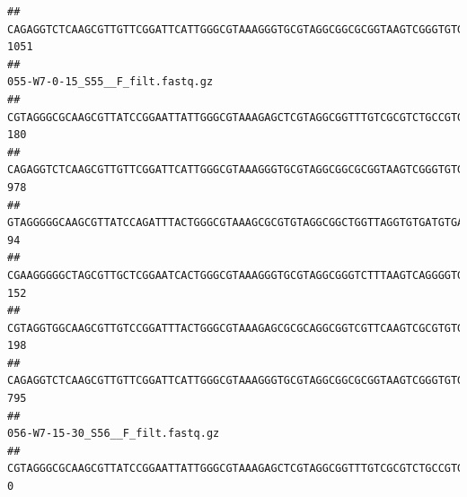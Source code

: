 \documentclass[]{article}
\begin{document}
\begin{verbatim}
## CAGAGGTCTCAAGCGTTGTTCGGATTCATTGGGCGTAAAGGGTGCGTAGGCGGCGCGGTAAGTCGGGTGTGAAATCTCGGGGCTTAACTCCGAAACTGCATTCGATACTGCCGTGCTTGAGGACTGGAGAGGAGACTGGAATTTACGGTGTAGCGGTGAAATGCGTAGATATCGTAAGGAAGACCAGTGGCGAAGGCGGGTCTCTGGACAGTTCCTGACGCTGAGGCACGAAGGCCAGGGGAGCAAACG                              1051
##                                                                                                                                                                                                                                                           055-W7-0-15_S55__F_filt.fastq.gz
## CGTAGGGCGCAAGCGTTATCCGGAATTATTGGGCGTAAAGAGCTCGTAGGCGGTTTGTCGCGTCTGCCGTGAAAGTCCGGGGCTCAACTCCGGATCTGCGGTGGGTACGGGCAGACTAGAGTGATGTAGGGGAGACTGGAATTCCTGGTGTAGCGGTGAAATGCGCAGATATCAGGAGGAACACCGATGGCGAAGGCAGGTCTCTGGGCATTAACTGACGCTGAGGAGCGAAAGCATGGGGAGCGAACA                              180
## CAGAGGTCTCAAGCGTTGTTCGGATTCATTGGGCGTAAAGGGTGCGTAGGCGGCGCGGTAAGTCGGGTGTGAAATCTCGGAGCTTAACTCCGAAACTGCATTCGATACTGCCGTGCTTGAGGACTGGAGAGGAGACTGGAATTTACGGTGTAGCGGTGAAATGCGTAGATATCGTAAGGAAGACCAGTGGCGAAGGCGGGTCTCTGGACAGTTCCTGACGCTGAGGCACGAAGGCCAGGGGAGCAAACG                              978
## GTAGGGGGCAAGCGTTATCCAGATTTACTGGGCGTAAAGCGCGTGTAGGCGGCTGGTTAGGTGTGATGTGAAATCTTCCGGCTCAACCGGAAAACTGCATTGCAAACCGGCCTGGCTAGAGTGCAGGAGAGGGAAGCGGAATTCCAGGTGTAGCGGTGAAATGCGTAGATATCTGGAGGAACACCAGTGGCGAAGGCGGCTTCCTGGCCTGCAACTGACGCTGAGACGCGAAAGCGTGGGGAGCGAAC                                94
## CGAAGGGGGCTAGCGTTGCTCGGAATCACTGGGCGTAAAGGGTGCGTAGGCGGGTCTTTAAGTCAGGGGTGAAATCCTGGAGCTCAACTCCAGAACTGCCTTTGATACTGAAGATCTTGAGTTCGGGAGAGGTGAGTGGAACTGCGAGTGTAGAGGTGAAATTCGTAGATATTCGCAAGAACACCAGTGGCGAAGGCGGCTCACTGGCCCGATACTGACGCTGAGGCACGAAAGCGTGGGGAGCAAACA                              152
## CGTAGGTGGCAAGCGTTGTCCGGATTTACTGGGCGTAAAGAGCGCGCAGGCGGTCGTTCAAGTCGCGTGTGAAAGCCCCCGGCTCAACTGGGGAGGGTCACGCGATACTGATCGACTCGAAGGCAGGAGAGGGTAGTGGAATTCCCGGTGTAGTGGTGAAATGCGTAGATATCGGGAGGAACACCAGTGGCGAAGGCGACTACCTGGCCTGTTCTTGACGCTGAGGCGCGAAAGCTAGGGGAGCAAACG                              198
## CAGAGGTCTCAAGCGTTGTTCGGATTCATTGGGCGTAAAGGGTGCGTAGGCGGCGCGGTAAGTCGGGTGTGAAATCTCGGGGCTTAACTCCGAAACTGCATTCGATACTGCCGTGCTTGAGGACTGGAGAGGAGACTGGAATTTACGGTGTAGCGGTGAAATGCGTAGATATCGTAAGGAAGACCAGTGGCGAAGGCGGGTCTCTGGACAGTTCCTGACGCTGAGGCACGAAGGCCAGGGGAGCAAACG                              795
##                                                                                                                                                                                                                                                           056-W7-15-30_S56__F_filt.fastq.gz
## CGTAGGGCGCAAGCGTTATCCGGAATTATTGGGCGTAAAGAGCTCGTAGGCGGTTTGTCGCGTCTGCCGTGAAAGTCCGGGGCTCAACTCCGGATCTGCGGTGGGTACGGGCAGACTAGAGTGATGTAGGGGAGACTGGAATTCCTGGTGTAGCGGTGAAATGCGCAGATATCAGGAGGAACACCGATGGCGAAGGCAGGTCTCTGGGCATTAACTGACGCTGAGGAGCGAAAGCATGGGGAGCGAACA                                 0

\end{verbatim}
\end{document}
